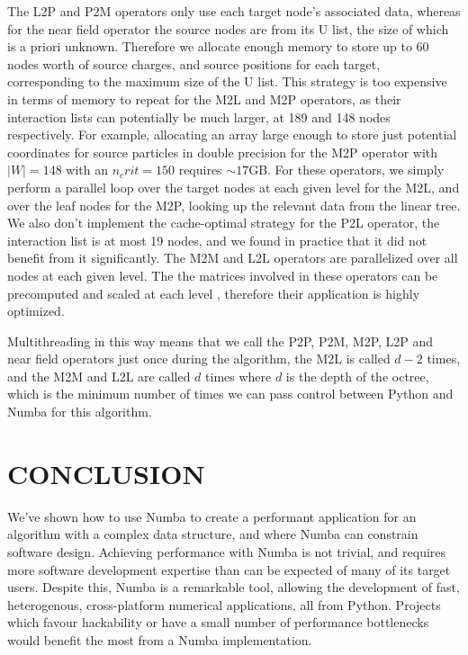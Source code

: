\documentclass{IEEEcsmag}
\begin{document}
The L2P and P2M operators only use each target node's associated data, whereas for the near field operator the source nodes are from its U list, the size of which is a priori unknown. Therefore we allocate enough memory to store up to 60 nodes worth of source charges, and source positions for each target, corresponding to the maximum size of the U list. This strategy is too expensive in terms of memory to repeat for the M2L and M2P operators, as their interaction lists can potentially be much larger, at 189 and 148 nodes respectively. For example, allocating an array large enough to store just potential coordinates for source particles in double precision for the M2P operator with $|W|=148$ with an $n_crit=150$ requires $\sim 17$GB. For these operators, we simply perform a parallel loop over the target nodes at each given level for the M2L, and over the leaf nodes for the M2P, looking up the relevant data from the linear tree. We also don't implement the cache-optimal strategy for the P2L operator, the interaction list is at most 19 nodes, and we found in practice that it did not benefit from it significantly. The M2M and L2L operators are parallelized over all nodes at each given level. The the matrices involved in these operators can be precomputed and scaled at each level \cite{Wang2021}, therefore their application is highly optimized.

Multithreading in this way means that we call the P2P, P2M, M2P, L2P and near field operators just once during the algorithm, the M2L is called $d-2$ times, and the M2M and L2L are called $d$ times where $d$ is the depth of the octree, which is the minimum number of times we can pass control between Python and Numba for this algorithm.

\section{CONCLUSION}

We've shown how to use Numba to create a performant application for an algorithm with a complex data structure, and where Numba can constrain software design. Achieving performance with Numba is not trivial, and requires more software development expertise than can be expected of many of its target users. Despite this, Numba is a remarkable tool, allowing the development of fast, heterogenous, cross-platform numerical applications, all from Python. Projects which favour hackability or have a small number of performance bottlenecks would benefit the most from a Numba implementation.
\end{document}
